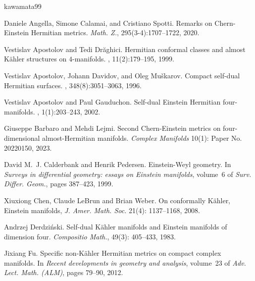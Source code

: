 \documentclass[12pt, reqno]{amsart} \usepackage{pifont} \usepackage{mathrsfs}
\theoremstyle{plain} \newtheorem{thm}{Theorem}[section]
\theoremstyle{definition} \newtheorem{example}[thm]{Example}
\renewcommand{\>}{\rightarrow}
\numberwithin{equation}{section} %
\begin{document}
	\begin{thebibliography}{kawamata99}
		
		 Daniele Angella, Simone Calamai, and Cristiano
		Spotti. \newblock Remarks on {C}hern-{E}instein {H}ermitian metrics. \newblock
		{\em Math. Z.}, 295(3-4):1707--1722, 2020.
		
		 Vestislav Apostolov and Tedi Dr\u{a}ghici.
		\newblock Hermitian conformal classes and almost {K}\"{a}hler structures on
		{$4$}-manifolds. , 11(2):179--195,
		1999.
		
		 Vestislav Apostolov, Johann Davidov, and Oleg
		Mu\v{s}karov. \newblock Compact self-dual {H}ermitian surfaces. , 348(8):3051--3063, 1996.
		
		 Vestislav Apostolov and Paul Gauduchon. \newblock
		Self-dual {E}instein {H}ermitian four-manifolds. , 1(1):203--243, 2002.
		
		
		
		Giuseppe Barbaro and Mehdi  Lejmi. Second Chern-Einstein
		metrics on four-dimensional almost-Hermitian manifolds. \emph{Complex
			Manifolds} 10(1): Paper No. 20220150, 2023.
		
		
		
		 David M.~J. Calderbank and Henrik Pedersen.
		\newblock Einstein-{W}eyl geometry. \newblock In {\em Surveys in differential
			geometry: essays on {E}instein manifolds}, volume~6 of {\em Surv. Differ.
			Geom.}, pages 387--423, 1999.
		
		
		
		
		
		
		
		
		 Xiuxiong Chen, Claude LeBrun and Brian Weber. On
		conformally K\"ahler, Einstein manifolds, \emph{J. Amer. Math. Soc.} 21(4):
		1137--1168, 2008.
		
		
		
		 Andrzej Derdzi\'nski.  Self-dual K\"ahler manifolds
		and Einstein manifolds of dimension four. \emph{Compositio Math.}, 49(3):
		405--433, 1983.
		
		
		
		
		
		
		 Jixiang Fu. \newblock Specific non-{K}\"{a}hler
		{H}ermitian metrics on compact complex manifolds. \newblock In {\em Recent
			developments in geometry and analysis}, volume~23 of {\em Adv. Lect. Math.
			(ALM)}, pages 79--90,  2012.
		

\end{thebibliography}
\end{document}

